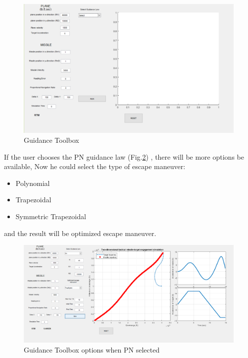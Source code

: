 \begin{figure}[H]
	\centering
	\includegraphics[scale = 0.45]{fig/GUI.PNG}
	\caption{Guidance Toolbox}
	\label{Guidance Toolbox}
\end{figure}


If the user chooses the PN guidance law (Fig.\ref{Guidance Toolbox PN}) , there will be more options be available, Now he could select the type of escape maneuver:
\begin{itemize}
	\item Polynomial
	\item Trapezoidal
	\item Symmetric Trapezoidal
\end{itemize}

and the result will be optimized escape maneuver. 

\begin{figure}[H]
	\centering
	\includegraphics[scale = 0.4]{fig/guiPN.PNG}
	\caption{Guidance Toolbox options when PN selected}
	\label{Guidance Toolbox PN}
\end{figure}
  


